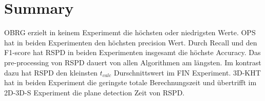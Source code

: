 \documentclass[main.tex]{subfiles}
\begin{document}
\section{Summary}
OBRG erzielt in keinem Experimemt die höchsten oder niedrigsten Werte.
OPS hat in beiden Experimenten den höchsten precision Wert.
Durch Recall und den F1-score hat RSPD in beiden Experimenten insgesamt die höchste Accuracy. 
Das pre-processing von RSPD dauert von allen Algorithmen am längsten. Im kontrast dazu hat RSPD 
den kleinsten $t_{calc}$ Durschnittswert im FIN Experiment.
3D-KHT hat in beiden Experiment die geringste totale Berechnungszeit und übertrifft im 2D-3D-S Experiment die
plane detection Zeit von RSPD.

\end{document}
